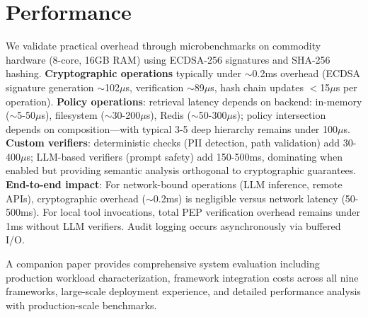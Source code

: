 \section{Performance}
\label{sec:performance}

We validate practical overhead through microbenchmarks on commodity hardware (8-core, 16GB RAM) using ECDSA-256 signatures and SHA-256 hashing. \textbf{Cryptographic operations} typically under $\sim$0.2ms overhead (ECDSA signature generation $\sim$102$\mu$s, verification $\sim$89$\mu$s, hash chain updates $<$15$\mu$s per operation). \textbf{Policy operations}: retrieval latency depends on backend: in-memory ($\sim$5-50$\mu$s), filesystem ($\sim$30-200$\mu$s), Redis ($\sim$50-300$\mu$s); policy intersection depends on composition---with typical 3-5 deep hierarchy remains under 100$\mu$s. \textbf{Custom verifiers}: deterministic checks (PII detection, path validation) add 30-400$\mu$s; LLM-based verifiers (prompt safety) add 150-500ms, dominating when enabled but providing semantic analysis orthogonal to cryptographic guarantees. \textbf{End-to-end impact}: For network-bound operations (LLM inference, remote APIs), cryptographic overhead ($\sim$0.2ms) is negligible versus network latency (50-500ms). For local tool invocations, total PEP verification overhead remains under 1ms without LLM verifiers. Audit logging occurs asynchronously via buffered I/O.

A companion paper provides comprehensive system evaluation including production workload characterization, framework integration costs across all nine frameworks, large-scale deployment experience, and detailed performance analysis with production-scale benchmarks.
